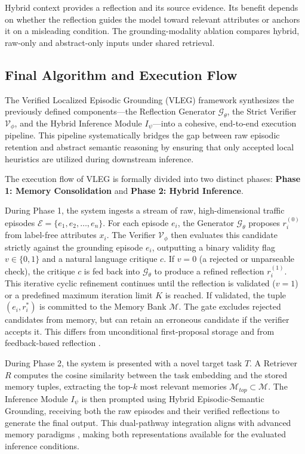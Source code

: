 \documentclass[journal]{IEEEtran}
\theoremstyle{definition}
\theoremstyle{remark}
\begin{document}
Hybrid context provides a reflection and its source evidence. Its benefit depends on whether the reflection guides the model toward relevant attributes or anchors it on a misleading condition. The grounding-modality ablation compares hybrid, raw-only and abstract-only inputs under shared retrieval.

\subsection{Final Algorithm and Execution Flow}
The Verified Localized Episodic Grounding (VLEG) framework synthesizes the previously defined components---the Reflection Generator $\mathcal{G}_\theta$, the Strict Verifier $\mathcal{V}_\phi$, and the Hybrid Inference Module $I_\psi$---into a cohesive, end-to-end execution pipeline. This pipeline systematically bridges the gap between raw episodic retention \cite{brown2020language} and abstract semantic reasoning \cite{agarwal2026hypothesis} by ensuring that only accepted local heuristics are utilized during downstream inference.

The execution flow of VLEG is formally divided into two distinct phases: \textbf{Phase 1: Memory Consolidation} and \textbf{Phase 2: Hybrid Inference}.

During Phase 1, the system ingests a stream of raw, high-dimensional traffic episodes $\mathcal{E} = \{e_1, e_2, \dots, e_n\}$. For each episode $e_i$, the Generator $\mathcal{G}_\theta$ proposes $r_i^{(0)}$ from label-free attributes $x_i$. The Verifier $\mathcal{V}_\phi$ then evaluates this candidate strictly against the grounding episode $e_i$, outputting a binary validity flag $v \in \{0, 1\}$ and a natural language critique $c$. If $v = 0$ (a rejected or unparseable check), the critique $c$ is fed back into $\mathcal{G}_\theta$ to produce a refined reflection $r_i^{(1)}$. This iterative cyclic refinement continues until the reflection is validated ($v=1$) or a predefined maximum iteration limit $K$ is reached. If validated, the tuple $(e_i, r_i^*)$ is committed to the Memory Bank $\mathcal{M}$. The gate excludes rejected candidates from memory, but can retain an erroneous candidate if the verifier accepts it. This differs from unconditional first-proposal storage and from feedback-based reflection \cite{shinn2023reflexion}.

During Phase 2, the system is presented with a novel target task $T$. A Retriever $R$ computes the cosine similarity between the task embedding and the stored memory tuples, extracting the top-$k$ most relevant memories $\mathcal{M}_{top} \subset \mathcal{M}$. The Inference Module $I_\psi$ is then prompted using Hybrid Episodic-Semantic Grounding, receiving both the raw episodes and their verified reflections to generate the final output. This dual-pathway integration aligns with advanced memory paradigms \cite{wu2025from}, making both representations available for the evaluated inference conditions.
\end{document}
